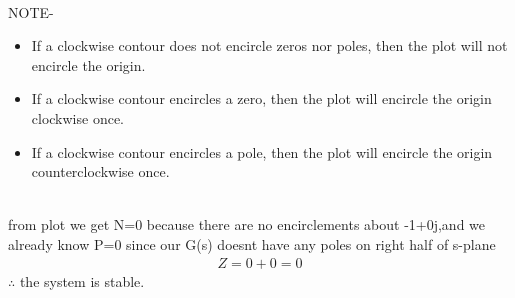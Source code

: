 \begin{enumerate}[label=\thesection.\arabic*.,ref=\thesection.\theenumi]
\begin{tabular}{ |p{4cm}||p{4cm}|  }
 \hline
\end{tabular}
\\
\newline NOTE-
\begin{itemize}
\item If a clockwise contour does not encircle zeros nor poles, then the plot will not encircle the origin.
\item If a clockwise contour encircles a zero, then the plot will encircle the origin clockwise once.
\item If a clockwise contour encircles a pole, then the plot will encircle the origin counterclockwise once.
\end{itemize}
\\
\newline from plot we get N=0 because there are no encirclements about -1+0j,and we already know P=0 since our G(s) doesnt have any poles on right half of s-plane
\begin{align}
Z=0+0=0
\end{align}
$\therefore$ the system is stable.



\end{enumerate}

